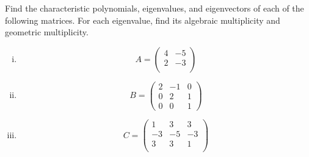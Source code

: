 \begin{question}
    \normalfont
    Find the characteristic polynomials, eigenvalues, and eigenvectors of each of the following matrices. For each eigenvalue, find its algebraic multiplicity and geometric multiplicity.
    \begin{enumerate}[(i)]
        \item
              \[
                  A= \begin{pmatrix}
                      4 & -5 \\
                      2 & -3 \\
                  \end{pmatrix}
              \]

        \item
              \[
                  B= \begin{pmatrix}
                      2 & -1 & 0 \\
                      0 & 2  & 1 \\
                      0 & 0  & 1
                  \end{pmatrix}
              \]
        \item
              \[
                  C= \begin{pmatrix}
                      1  & 3  & 3  \\
                      -3 & -5 & -3 \\
                      3  & 3  & 1  \\
                  \end{pmatrix}
              \]
    \end{enumerate}

\end{question}

